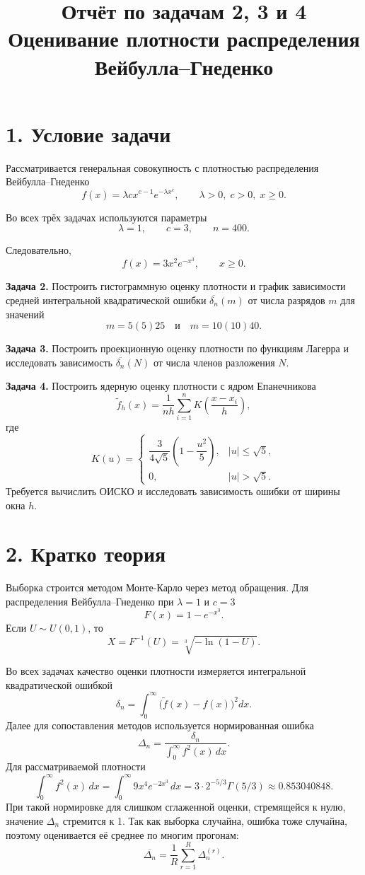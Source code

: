 \documentclass[12pt,a4paper]{article}
\title{Отчёт по задачам 2, 3 и 4\\[4pt]
Оценивание плотности распределения Вейбулла--Гнеденко}
\author{}
\date{}
\begin{document}
\maketitle

\section*{1. Условие задачи}

Рассматривается генеральная совокупность с плотностью распределения Вейбулла--Гнеденко
\[
f(x)=\lambda c x^{c-1} e^{-\lambda x^c}, \qquad \lambda>0,\; c>0,\; x\ge 0.
\]

Во всех трёх задачах используются параметры
\[
\lambda=1, \qquad c=3, \qquad n=400.
\]

Следовательно,
\[
f(x)=3x^2e^{-x^3}, \qquad x\ge 0.
\]

\textbf{Задача 2.} Построить гистограммную оценку плотности и график зависимости средней интегральной квадратической ошибки $\overline{\delta_n}(m)$ от числа разрядов $m$ для значений
\[
m=5(5)25 \quad \text{и} \quad m=10(10)40.
\]

\textbf{Задача 3.} Построить проекционную оценку плотности по функциям Лагерра и исследовать зависимость $\overline{\delta_n}(N)$ от числа членов разложения $N$.

\textbf{Задача 4.} Построить ядерную оценку плотности с ядром Епанечникова
\[
\widetilde{f}_h(x)=\frac{1}{nh}\sum_{i=1}^{n}K\!\left(\frac{x-x_i}{h}\right),
\]
где
\[
K(u)=
\begin{cases}
\dfrac{3}{4\sqrt{5}}\left(1-\dfrac{u^2}{5}\right), & |u|\le\sqrt{5},\\[6pt]
0, & |u|>\sqrt{5}.
\end{cases}
\]
Требуется вычислить ОИСКО и исследовать зависимость ошибки от ширины окна $h$.

\section*{2. Кратко теория}

Выборка строится методом Монте-Карло через метод обращения. Для распределения Вейбулла--Гнеденко при $\lambda=1$ и $c=3$
\[
F(x)=1-e^{-x^3}.
\]
Если $U\sim U(0,1)$, то
\[
X=F^{-1}(U)=\sqrt[3]{-\ln(1-U)}.
\]

Во всех задачах качество оценки плотности измеряется интегральной квадратической ошибкой
\[
\delta_n=\int_0^{\infty}\bigl(\widetilde{f}(x)-f(x)\bigr)^2dx.
\]
Далее для сопоставления методов используется нормированная ошибка
\[
\Delta_n=\frac{\delta_n}{\int_0^\infty f^2(x)\,dx}.
\]
Для рассматриваемой плотности
\[
\int_0^\infty f^2(x)\,dx
=\int_0^\infty 9x^4e^{-2x^3}\,dx
=3\cdot 2^{-5/3}\Gamma(5/3)
\approx 0.853040848.
\]
При такой нормировке для слишком сглаженной оценки, стремящейся к нулю, значение
$\Delta_n$ стремится к 1.
Так как выборка случайна, ошибка тоже случайна, поэтому оценивается её среднее по многим прогонам:
\[
\overline{\Delta_n}=\frac{1}{R}\sum_{r=1}^{R}\Delta_n^{(r)}.
\]
\end{document}

